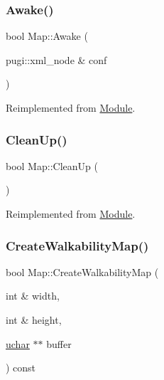 \subsubsection{\texorpdfstring{Awake()}{Awake()}}
{\footnotesize\ttfamily bool Map\+::\+Awake (\begin{DoxyParamCaption}\item[{pugi\+::xml\+\_\+node \&}]{conf }\end{DoxyParamCaption})\hspace{0.3cm}{\ttfamily [virtual]}}



Reimplemented from \mbox{\hyperlink{class_module_a4a283650cf8a73aa0b5599106bc2ba6c}{Module}}.

\mbox{\label{class_map_acc2cb08f31839bf0545d7b47100b3884}} 
\subsubsection{\texorpdfstring{CleanUp()}{CleanUp()}}
{\footnotesize\ttfamily bool Map\+::\+Clean\+Up (\begin{DoxyParamCaption}{ }\end{DoxyParamCaption})\hspace{0.3cm}{\ttfamily [virtual]}}



Reimplemented from \mbox{\hyperlink{class_module_a77d7a006e42c0bd10110e1adbd4598cb}{Module}}.

\mbox{\label{class_map_aa93a87c24c2bac810c7b2c63a6c32000}} 
\subsubsection{\texorpdfstring{CreateWalkabilityMap()}{CreateWalkabilityMap()}}
{\footnotesize\ttfamily bool Map\+::\+Create\+Walkability\+Map (\begin{DoxyParamCaption}\item[{int \&}]{width,  }\item[{int \&}]{height,  }\item[{\mbox{\hyperlink{_defs_8h_a65f85814a8290f9797005d3b28e7e5fc}{uchar}} $\ast$$\ast$}]{buffer }\end{DoxyParamCaption}) const}

